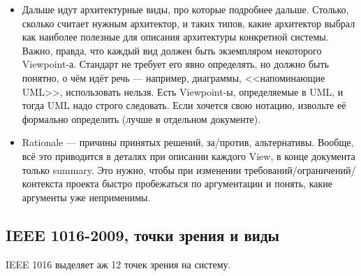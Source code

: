 \documentclass[a5paper]{article}
\begin{document}
\begin{itemize}
\begin{itemize}
        \end{itemize}
    \item Дальше идут архитектурные виды, про которые подробнее дальше. Столько, сколько считает нужным архитектор, и таких типов, какие архитектор выбрал как наиболее полезные для описания архитектуры конкретной системы. Важно, правда, что каждый вид должен быть экземпляром некоторого Viewpoint-а. Стандарт не требует его явно определять, но должно быть понятно, о чём идёт речь --- например, диаграммы, <<напоминающие UML>>, использовать нельзя. Есть Viewpoint-ы, определяемые в UML, и тогда UML надо строго следовать. Если хочется свою нотацию, извольте её формально определить (лучше в отдельном документе).
    \item Rationale --- причины принятых решений, за/против, альтернативы. Вообще, всё это приводится в деталях при описании каждого View, в конце документа только summary. Это нужно, чтобы при изменении требований/ограничений/контекста проекта быстро пробежаться по аргументации и понять, какие аргументы уже неприменимы.
\end{itemize}

\subsection{IEEE 1016-2009, точки зрения и виды}

IEEE 1016 выделяет аж 12 точек зрения на систему. 
\end{document}
